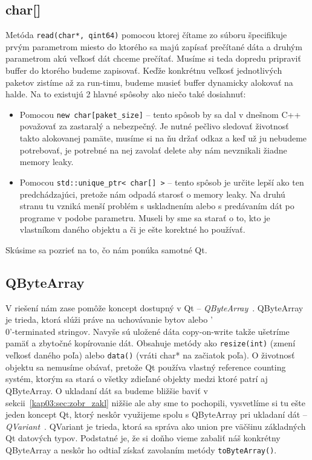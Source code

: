 \subsection*{char[]}
Metóda \texttt{read(char*, qint64)} pomocou ktorej čítame zo súboru špecifikuje prvým parametrom miesto do ktorého sa majú zapísať prečítané dáta a druhým parametrom akú veľkosť dát chceme prečítať. Musíme si teda dopredu pripraviť buffer do ktorého budeme zapisovať. Keďže konkrétnu veľkosť jednotlivých paketov zistíme až za run-timu, budeme musieť buffer dynamicky alokovať na halde. Na to existujú 2 hlavné spôsoby ako niečo také dosiahnuť:
\begin{itemize}
\item Pomocou \texttt{new char[paket\_size]} -- tento spôsob by sa dal v dnešnom C++ považovať za zastaralý a nebezpečný. Je nutné pečlivo sledovať životnosť takto alokovanej pamäte, musíme si na ňu držať odkaz a keď už ju nebudeme potrebovať, je potrebné na nej zavolať delete aby nám nevznikali žiadne memory leaky.
\item Pomocou \texttt{std::unique\_ptr\textless~char[]~\textgreater} -- tento spôsob je určite lepší ako ten predchádzajúci, pretože nám odpadá starosť o memory leaky. Na druhú stranu tu vzniká menší problém s uskladnením alebo s predávaním dát po programe v podobe parametru. Museli by sme sa starať o to, kto je vlastníkom daného objektu a či je ešte korektné ho používať.
\end{itemize}

Skúsime sa pozrieť na to, čo nám ponúka samotné Qt.

\subsection*{QByteArray}
\label{kap03:sec:uch_dat:qbytearray}
V riešení nám zase pomôže koncept dostupný v Qt -- \textit{QByteArray}~\cite{qbytearray}. QByteArray je trieda, ktorá slúži práve na uchovávanie bytov alebo '\\0'-terminated stringov. Navyše sú uložené dáta copy-on-write takže ušetríme pamäť a zbytočné kopírovanie dát. Obsahuje metódy ako \texttt{resize(int)} (zmení veľkosť daného poľa) alebo \texttt{data()} (vráti char* na začiatok poľa). O životnosť objektu sa nemusíme obávať, pretože Qt používa vlastný reference counting systém, ktorým sa stará o všetky zdieľané objekty medzi ktoré patrí aj QByteArray. O ukladaní dát sa budeme bližšie baviť v sekcii~\ref{kap03:sec:zobr_zakl} nižšie ale aby sme to pochopili, vysvetlíme si tu ešte jeden koncept Qt, ktorý neskôr využijeme spolu s QByteArray pri ukladaní dát -- \textit{QVariant}~\cite{qvariant}. QVariant je trieda, ktorá sa správa ako union pre väčšinu základných Qt datových typov. Podstatné je, že si doňho vieme zabaliť náš konkrétny QByteArray a neskôr ho odtiaľ získať zavolaním metódy \texttt{toByteArray()}.



